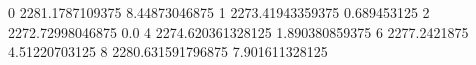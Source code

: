 0 2281.1787109375 8.44873046875
1 2273.41943359375 0.689453125
2 2272.72998046875 0.0
4 2274.620361328125 1.890380859375
6 2277.2421875 4.51220703125
8 2280.631591796875 7.901611328125
